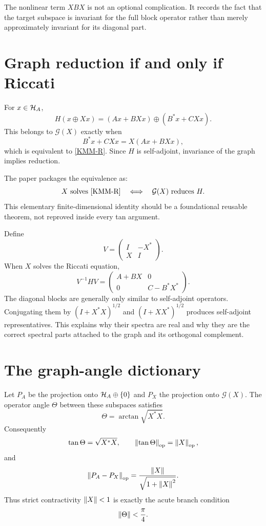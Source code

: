 The nonlinear term $XBX$ is not an optional complication. It records the fact that the target subspace is invariant for the full block operator rather than merely approximately invariant for its diagonal part.

\section{Graph reduction if and only if Riccati}

For $x\in\mathcal{H}_A$,
\[
 H(x\oplus Xx)
 =
 (Ax+BXx)\oplus(B^*x+CXx).
\]
This belongs to $\mathcal G(X)$ exactly when
\[
 B^*x+CXx=X(Ax+BXx),
\]
which is equivalent to \eqref{KMM-R}. Since $H$ is self-adjoint, invariance of the graph implies reduction.

The paper packages the equivalence as:
\[
 X\text{ solves \eqref{KMM-R}}
 \quad\Longleftrightarrow\quad
 \mathcal G(X)\text{ reduces }H.
\]
This elementary finite-dimensional identity should be a foundational reusable theorem, not reproved inside every tan argument.

Define
\[
 V=
 \begin{pmatrix}
 I&-X^*\\
 X&I
 \end{pmatrix}.
\]
When $X$ solves the Riccati equation,
\[
 V^{-1}HV
 =
 \begin{pmatrix}
 A+BX&0\\
 0&C-B^*X^*
 \end{pmatrix}.
\]
The diagonal blocks are generally only similar to self-adjoint operators. Conjugating them by $(I+X^*X)^{1/2}$ and $(I+XX^*)^{1/2}$ produces self-adjoint representatives. This explains why their spectra are real and why they are the correct spectral parts attached to the graph and its orthogonal complement.

\section{The graph-angle dictionary}

Let $P_A$ be the projection onto $\mathcal{H}_A\oplus\{0\}$ and $P_X$ the projection onto $\mathcal G(X)$. The operator angle $\Theta$ between these subspaces satisfies
\[
 \Theta=\arctan\sqrt{X^*X}.
\]
Consequently
\[
 \tan\Theta=\sqrt{X^*X},
 \qquad
 \left\lVert \tan\Theta\right\rVert_{\mathrm{op}}=\left\lVert X\right\rVert_{\mathrm{op}},
\]
and
\[
 \left\lVert P_A-P_X\right\rVert_{\mathrm{op}}
 =\frac{\left\lVert X\right\rVert}{\sqrt{1+\left\lVert X\right\rVert^2}}.
\]
Thus strict contractivity $\left\lVert X\right\rVert<1$ is exactly the acute branch condition
\[
 \left\lVert \Theta\right\rVert<\frac{\pi}{4}.
\]

